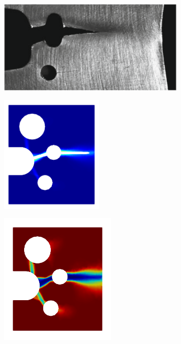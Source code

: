 \begin{frame}
\begin{columns}[T]
\begin{column}{0.6\textwidth}
\begin{figure}
        \begin{subfigure}{0.32\textwidth}
          \centering
          \includegraphics[width=\textwidth]{Chapter345/figures/SFC_schematics}
        \end{subfigure}
        \begin{subfigure}{0.32\textwidth}
          \centering
          \includegraphics[width=0.55\textwidth]{Chapter345/figures/W_pl_3}
        \end{subfigure}
        \begin{subfigure}{0.32\textwidth}
          \centering
          \includegraphics[width=0.62\textwidth]{Chapter345/figures/M_3}
        \end{subfigure}
        

\end{figure}
\end{column}
\end{columns}
\end{frame}
